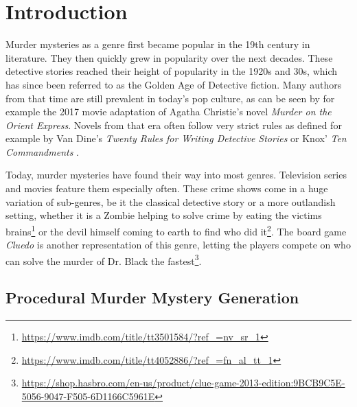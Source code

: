 \section{Introduction} \label{introduction}

Murder mysteries as a genre first became popular in the 19th century in literature.
They then quickly grew in popularity over the next decades.
These detective stories reached their height of popularity in the 1920s and 30s, which has since been referred to as the Golden Age of Detective fiction.
Many authors from that time are still prevalent in today's pop culture, as can be seen by for example the 2017 movie adaptation of Agatha Christie's novel \emph{Murder on the Orient Express}.
Novels from that era often follow very strict rules as defined for example by Van Dine's \emph{Twenty Rules for Writing Detective Stories} \cite{van_dine_1928} or Knox' \emph{Ten Commandments} \cite{knox_1929}.

Today, murder mysteries have found their way into most genres.
Television series and movies feature them especially often.
These crime shows come in a huge variation of sub-genres, be it the classical detective story or a more outlandish setting, whether it is a Zombie helping to solve crime by eating the victims brains\footnote{\url{https://www.imdb.com/title/tt3501584/?ref_=nv_sr_1}} or the devil himself coming to earth to find who did it\footnote{\url{https://www.imdb.com/title/tt4052886/?ref_=fn_al_tt_1}}.
The board game \emph{Cluedo} is another representation of this genre, letting the players compete on who can solve the murder of Dr. Black the fastest\footnote{\url{https://shop.hasbro.com/en-us/product/clue-game-2013-edition:9BCB9C5E-5056-9047-F505-6D1166C5961E}}.

\subsection{Procedural Murder Mystery Generation}

